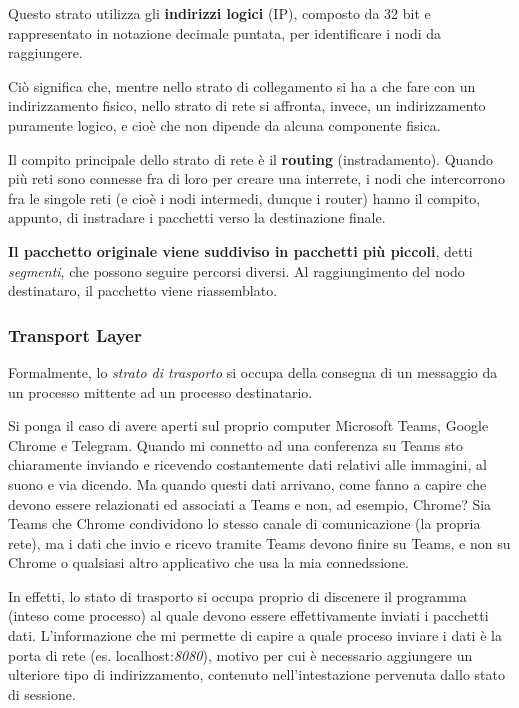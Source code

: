 \vspace{3mm}

Questo strato utilizza gli \textbf{indirizzi logici} (IP), composto da 32 bit e rappresentato in notazione decimale puntata, per identificare i nodi da raggiungere. 

Ciò significa che, mentre nello strato di collegamento si ha a che fare con un indirizzamento fisico, nello strato di rete si affronta, invece, un indirizzamento puramente logico, e cioè che non dipende da alcuna componente fisica.

\vspace{3mm}

Il compito principale dello strato di rete è il \textbf{routing} (instradamento). Quando più reti sono connesse fra di loro per creare una interrete, i nodi che intercorrono fra le singole reti (e cioè i nodi intermedi, dunque i router) hanno il compito, appunto, di instradare i pacchetti verso la destinazione finale. 

\textbf{Il pacchetto originale viene suddiviso in pacchetti più piccoli}, detti \textit{segmenti}, che possono seguire percorsi diversi. Al raggiungimento del nodo destinataro, il pacchetto viene riassemblato.

\subsubsection{Transport Layer}

Formalmente, lo \textit{strato di trasporto} si occupa della consegna di un messaggio da un processo mittente ad un processo destinatario. 

\vspace{3mm}

Si ponga il caso di avere aperti sul proprio computer Microsoft Teams, Google Chrome e Telegram. Quando mi connetto ad una conferenza su Teams sto chiaramente inviando e ricevendo costantemente dati relativi alle immagini, al suono e via dicendo. Ma quando questi dati arrivano, come fanno a capire che devono essere relazionati ed associati a Teams e non, ad esempio, Chrome? Sia Teams che Chrome condividono lo stesso canale di comunicazione (la propria rete), ma i dati che invio e ricevo tramite Teams devono finire su Teams, e non su Chrome o qualsiasi altro applicativo che usa la mia connedssione.

\vspace{3mm}

In effetti, lo stato di trasporto si occupa proprio di discenere il programma (inteso come processo) al quale devono essere effettivamente inviati i pacchetti dati. L'informazione che mi permette di capire a quale proceso inviare i dati è la porta di rete (es. localhost:\textit{8080}), motivo per cui è necessario aggiungere un ulteriore tipo di indirizzamento, contenuto nell'intestazione pervenuta dallo stato di sessione.


